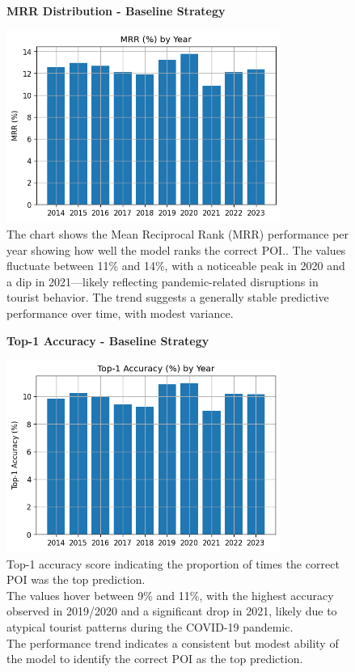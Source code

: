 \documentclass[12pt,a4paper]{article}
\begin{document}
\begin{enumerate}
\begin{figure}[H]
\centering
\textbf{MRR Distribution - Baseline Strategy}\par
\vspace{0.5em}
\includegraphics[width=0.8\textwidth]{../img/no_SPACE-GEO_n-1_come_current_POI/mrr_distribution.png}
\caption{The chart shows the Mean Reciprocal Rank (MRR) performance per year showing how well the model ranks the correct POI.. The values fluctuate between 11\% and 14\%, with a noticeable peak in 2020 and a dip in 2021—likely reflecting pandemic-related disruptions in tourist behavior. The trend suggests a generally stable predictive performance over time, with modest variance.
}
\label{fig:baseline_mrr}
\end{figure}

\begin{figure}[H]
\centering
\textbf{Top-1 Accuracy - Baseline Strategy}\par
\vspace{0.5em}
\includegraphics[width=0.8\textwidth]{../img/no_SPACE-GEO_n-1_come_current_POI/top1_accuracy.png}
\caption{Top-1 accuracy score indicating the proportion of times the correct POI was the top prediction.\\ The values hover between 9\% and 11\%, with the highest accuracy observed in 2019/2020 and a significant drop in 2021, likely due to atypical tourist patterns during the COVID-19 pandemic.\\ The performance trend indicates a consistent but modest ability of the model to identify the correct POI as the top prediction.
}
\label{fig:baseline_top1}
\end{figure}


\end{enumerate}
\end{document}
